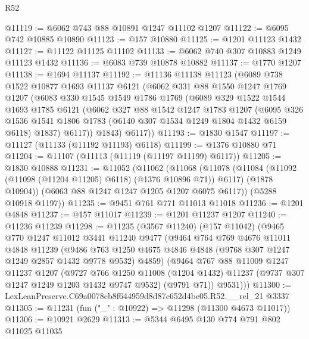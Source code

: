 \begin{lexlean}{R52}
\begin{coremodule}
@11119 := @6062 @743 @88 @10891 @1247 @11102 @1207
@11122 := @6095 @742 @10885 @10890
@11123 := @157 @10880
@11125 := @1201 @11123 @1432
@11127 := @11122 @11125 @11102
@11133 := @6062 @740 @307 @10883 @1249 @11123 @1432
@11136 := @6083 @739 @10878 @10882
@11137 := @1770 @1207
@11138 := @1694 @11137
@11192 := @11136
    @11138
    @11123
    (@6089
      @738
      @1522
      @10877
      @1693
      @11137
      @6121
      (@6062
        @331
        @88
        @1550
        @1247
        @1769
        @1207
        (@6083
          @330
          @1545
          @1549
          @1786
          @1769
          (@6089
            @329
            @1522
            @1544
            @1693
            @1785
            @6121
            (@6062
              @327
              @88
              @1542
              @1247
              @1783
              @1207
              (@6095
                @326
                @1536
                @1541
                @1806
                @1783
                (@6140 @307 @1534 @1249 @1804 @1432 @6159 @6118)
                @1837)
              @6117))
          @1843)
        @6117))
@11193 := @1830 @1547
@11197 := @11127 (@11133 (@11192 @11193) @6118)
@11199 := @1376 @10880 @71
@11204 := @11107 (@11113 (@11119 (@11197 @11199) @6117))
@11205 := @1830 @10888
@11231 := @11052
    (@11062
      (@11068
        (@11078
          (@11084 (@11092 (@11098 (@11204 @11205) @6118) (@1376 @10896 @71)) @6117)
          (@1878 @10904))
        (@6063 @88 @1247 @1247 @1205 @1207 @6075 @6117))
      (@5288 @10918 @1197))
@11235 := @9451 @761 @771 @11013 @11018
@11236 := @1201 @4848
@11237 := @157 @11017
@11239 := @1201 @11237 @1207
@11240 := @11236 @11239
@11298 := @11235
    (@3567 @11240)
    (@157 @11042)
    (@9465
      @770
      @1247
      @11012
      @3441
      @11240
      @9477
      (@9464
        @764
        @769
        @4676
        @11011
        @4848
        @11239
        (@9486 @763 @1250 @4675 @4846 @4848 (@9768 @307 @1247 @1249 @2857 @1432 @9778 @9532) @4859)
        (@9464
          @767
          @88
          @11009
          @1247
          @11237
          @1207
          (@9727
            @766
            @1250
            @11008
            (@1204 @1432)
            @11237
            (@9737 @307 @1247 @1249 @1203 @1432 @9747 @9532)
            (@9791 @71))
          @9531)))
@11300 := LexLeanPreserve.C69a0078cb8f644959d8d87c652d4be05.R52.__rel_21 @3337
@11305 := @11231 (fun ("_" : @10922) => @11298 (@11300 @4673 @11017))
@11306 := @10921 @2629
@11313 := @5344 @6495 @130 @774 @791 @802 @11025 @11035

\end{coremodule}
\end{lexlean}

